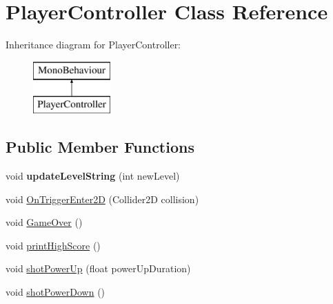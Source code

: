 \hypertarget{class_player_controller}{}\section{Player\+Controller Class Reference}
\label{class_player_controller}
Inheritance diagram for Player\+Controller\+:\begin{figure}[H]
\begin{center}
\leavevmode
\includegraphics[height=2.000000cm]{class_player_controller}
\end{center}
\end{figure}
\subsection*{Public Member Functions}
\begin{DoxyCompactItemize}
\item 
\mbox{\label{class_player_controller_a201205acdeda463736f868b6f20f05a3}} 
void {\bfseries update\+Level\+String} (int new\+Level)
\item 
void \mbox{\hyperlink{class_player_controller_a9cb907e7cb020bfa04ef52f158aa6fcb}{On\+Trigger\+Enter2D}} (Collider2D collision)
\item 
void \mbox{\hyperlink{class_player_controller_a022c877a529497a8fdb3fcf7e21cf090}{Game\+Over}} ()
\item 
void \mbox{\hyperlink{class_player_controller_a685b3e7478ec3431f858455832c45527}{print\+High\+Score}} ()
\item 
void \mbox{\hyperlink{class_player_controller_acbd4651a9689e6e27538e149b0e3f2a9}{shot\+Power\+Up}} (float power\+Up\+Duration)
\item 
void \mbox{\hyperlink{class_player_controller_a5d6e6be056b9cc9f2db7195e633bdd4c}{shot\+Power\+Down}} ()
\end{DoxyCompactItemize}
